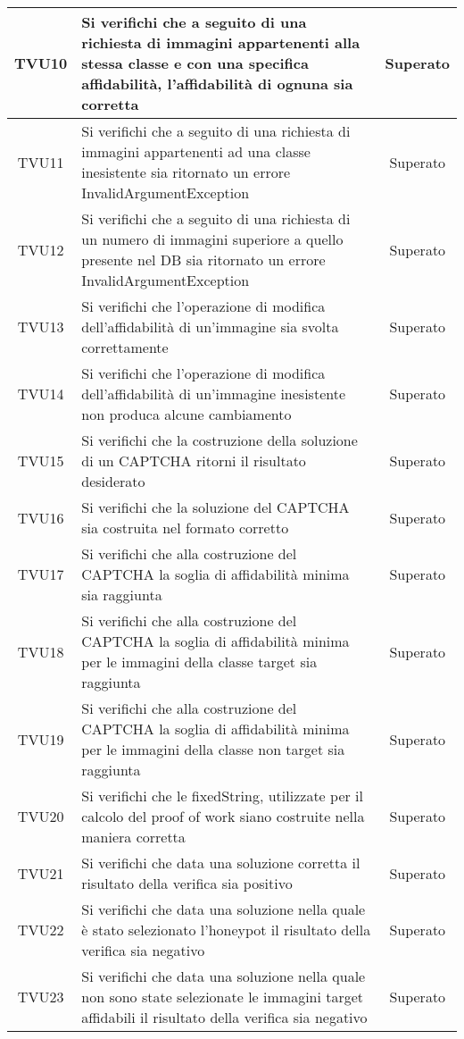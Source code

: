\begin{center}
\begin{xltabular}{\textwidth}{|c|X|c|}
		\hline
		TVU10 &  Si verifichi che a seguito di una richiesta di immagini appartenenti alla stessa classe e con una specifica affidabilità, l'affidabilità di ognuna sia corretta & Superato\\
		\hline
		TVU11 &  Si verifichi che a seguito di una richiesta di immagini appartenenti ad una classe inesistente sia ritornato un errore InvalidArgumentException & Superato\\
		\hline
		TVU12 &  Si verifichi che a seguito di una richiesta di un numero di immagini superiore a quello presente nel DB sia ritornato un errore InvalidArgumentException & Superato\\
		\hline
		TVU13 &  Si verifichi che l'operazione di modifica dell'affidabilità di un'immagine sia svolta correttamente & Superato\\
		\hline
		TVU14 &  Si verifichi che l'operazione di modifica dell'affidabilità di un'immagine inesistente non produca alcune cambiamento & Superato\\
		\hline
		TVU15 &  Si verifichi che la costruzione della soluzione di un CAPTCHA ritorni il risultato desiderato & Superato\\
		\hline
		TVU16 &  Si verifichi che la soluzione del CAPTCHA sia costruita nel formato corretto & Superato\\
		\hline
		TVU17 &  Si verifichi che alla costruzione del CAPTCHA la soglia di affidabilità minima sia raggiunta & Superato\\
		\hline
		TVU18 &  Si verifichi che alla costruzione del CAPTCHA la soglia di affidabilità minima per le immagini della classe target sia raggiunta & Superato\\
		\hline
		TVU19 &  Si verifichi che alla costruzione del CAPTCHA la soglia di affidabilità minima per le immagini della classe non target sia raggiunta & Superato\\
		\hline
		TVU20 &  Si verifichi che le fixedString, utilizzate per il calcolo del proof of work siano costruite nella maniera corretta & Superato\\
		\hline
		TVU21 & Si verifichi che data una soluzione corretta il risultato della verifica sia positivo  & Superato\\
		\hline
		TVU22 & Si verifichi che data una soluzione nella quale è stato selezionato l'honeypot il risultato della verifica sia negativo  & Superato\\
		\hline
		TVU23 & Si verifichi che data una soluzione nella quale non sono state selezionate le immagini target affidabili il risultato della verifica sia negativo  & Superato\\

\end{xltabular}
\end{center}
